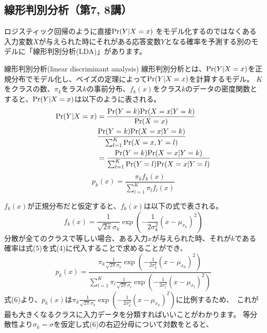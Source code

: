 \documentclass[uplatex]{jsarticle}
\begin{document}
\subsection{線形判別分析（第7, 8講）}
ロジスティック回帰のように直接${\rm Pr}(Y| X = x)$ をモデル化するのではなくある入力変数$X$が与えられた時にそれがある応答変数$Y$となる確率を予測する別のモデルに「線形判別分析(LDA)」があります。\
\begin{itembox}[l]{線形判別分析(linear discriminant analysis)}
  線形判別分析とは、${\rm Pr}(Y| X = x)$を正規分布でモデル化し、ベイズの定理によって${\rm Pr}(Y| X = x)$を計算するモデル。
  $K$をクラスの数、$\pi_k$をラス$k$の事前分布、$f_k(x)$をクラス$k$のデータの密度関数とすると、${\rm Pr}(Y| X = x)$は以下のように表される。
  \begin{equation}
    \begin{split}
      {\rm Pr}(Y| X = x) &= \frac{{\rm Pr}(Y = k){\rm Pr}(X = x| Y = k)}{{\rm Pr}(X = x)} \\
      &\frac{{\rm Pr}(Y = k){\rm Pr}(X = x| Y = k)}{\sum_{l=1}^K{\rm Pr}(X = x, Y = l)}\\
      &=\frac{{\rm Pr}(Y = k){\rm Pr}(X = x| Y = k)}{\sum_{l=1}^K{\rm Pr}(Y = l){\rm Pr}(X = x|Y = l)}\\
    \end{split}
  \end{equation}
    \begin{equation}
      p_k(x) = \frac{\pi_kf_k(x)}{\sum_{l=1}^K \pi_lf_l(x)}
    \end{equation}
\end{itembox}
$f_k(x)$が正規分布だと仮定すると、$f_k(x)$は以下の式で表される。
\begin{equation}
  f_k(x) = \frac{1}{\sqrt{2\pi}\sigma_k}\exp{\left(- \frac{1}{2\sigma_k^2}(x - \mu_{x_k})^2\right)}
\end{equation}
分散が全てのクラスで等しい場合、ある入力$x$が与えられた時、それが$k$である確率は式(5)を式(4)に代入することで求めることができ、\
\begin{equation}
        p_k(x) = \frac{\pi_k \frac{1}{\sqrt{2\pi}\sigma_k}\exp{\left(- \frac{1}{2\sigma_k^2}(x - \mu_{x_k})^2\right)}}{\sum_{l=1}^K \pi_l\frac{1}{\sqrt{2\pi}\sigma_l}\exp{\left(- \frac{1}{2\sigma_l^2}(x - \mu_{x_l})^2\right)}}
\end{equation}
式(6)より、$p_k(x)$は$\pi_k \frac{1}{\sqrt{2\pi}\sigma_k}\exp{\left(- \frac{1}{2\sigma_k^2}(x - \mu_{x_k})^2\right)}$に比例するため、\
これが最も大きくなるクラスに入力データを分類すればいいことがわかります。
等分散性より$\sigma_k = \sigma$を仮定し式(6)の右辺分母について対数をとると、
\end{document}
